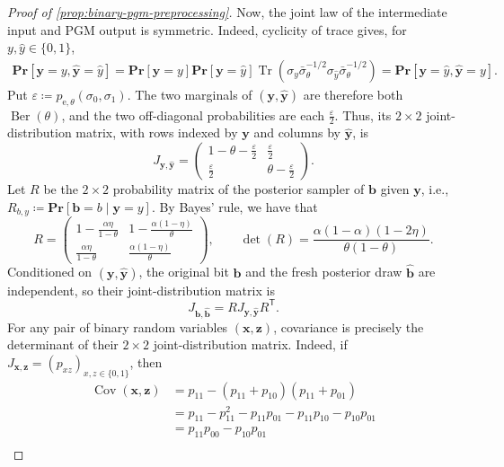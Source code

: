 \documentclass[11pt]{article}
\theoremstyle{remark}
\newcommand{\Ber}{\operatorname{Ber}}
\newcommand{\Tr}{\operatorname{Tr}}
\newcommand{\Prb}{\mathbf{Pr}}
\newcommand{\bits}{\{0,1\}}
\newcommand{\byhat}{\widehat{\mathbf{y}}}
\newcommand{\bbhat}{\widehat{\mathbf{b}}}
\newcommand{\bb}{\mathbf{b}}
\newcommand{\by}{\mathbf{y}}
\newcommand{\eps}{\varepsilon}
\begin{document}
\begin{proof}[Proof of \cref{prop:binary-pgm-preprocessing}]
Now, the joint law of the intermediate input and PGM output is symmetric. Indeed, cyclicity of trace gives, for $y,\hat{y} \in \bits$,
\begin{align*}
\Prb[\by = y,\byhat = \hat{y}]
= \Prb[\by = y]\Prb[\by = \hat{y}]\Tr\left(\sigma_y\bar{\sigma}_\theta^{-1/2}\sigma_{\hat{y}}\bar{\sigma}_\theta^{-1/2}\right)
=\Prb[\by = \hat{y},\byhat = y].
\end{align*}
Put $\eps \coloneqq p_{\mathrm{e},\theta}(\sigma_0,\sigma_1)$. The two marginals of $(\by,\byhat)$ are therefore both $\Ber(\theta)$, and the two off-diagonal probabilities are each $\frac{\eps}{2}$. Thus, its $2 \times 2$ joint-distribution matrix, with rows indexed by $\by$ and columns by $\byhat$, is
\begin{equation*}
J_{\by,\byhat}
= \begin{pmatrix}
1-\theta-\frac{\eps}{2} & \frac{\eps}{2} \\
\frac{\eps}{2} & \theta-\frac{\eps}{2}
\end{pmatrix}.
\end{equation*}
Let $R$ be the $2 \times 2$ probability matrix of the posterior sampler of $\bb$ given $\by$, i.e., $R_{b,y} \coloneqq \Prb[\bb = b \mid \by = y]$. By Bayes' rule, we have that
\begin{equation*}
R
= \begin{pmatrix}
1-\frac{\alpha\eta}{1-\theta} & 1-\frac{\alpha(1-\eta)}{\theta} \\
\frac{\alpha\eta}{1-\theta} & \frac{\alpha(1-\eta)}{\theta}
\end{pmatrix},
\qquad
\det(R) = \frac{\alpha(1-\alpha)(1-2\eta)}{\theta(1-\theta)}.
\end{equation*}
Conditioned on $(\by,\byhat)$, the original bit $\bb$ and the fresh posterior draw $\bbhat$ are independent, so their joint-distribution matrix is
\begin{equation*}
J_{\bb,\bbhat} = R J_{\by,\byhat}R^{\mathsf T}.
\end{equation*}
For any pair of binary random variables $(\mathbf{x},\mathbf{z})$, covariance is precisely the determinant of their $2 \times 2$ joint-distribution matrix. Indeed, if $J_{\mathbf{x},\mathbf{z}} = (p_{xz})_{x,z \in \bits}$, then
\begin{align*}
\operatorname{Cov}(\mathbf{x},\mathbf{z})
&= p_{11} - (p_{11} + p_{10})(p_{11} + p_{01}) \\
&= p_{11} - p_{11}^2 - p_{11}p_{01} - p_{11}p_{10} - p_{10}p_{01} \\
&= p_{11}p_{00}-p_{10}p_{01} \\

\end{align*}
\end{proof}
\end{document}
